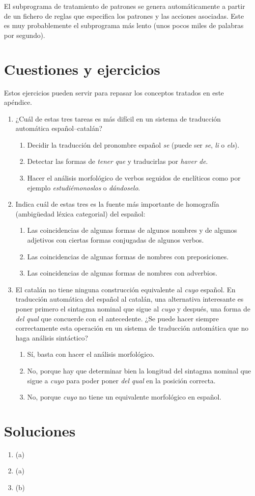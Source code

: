 El subprograma de tratamiento de patrones se genera automáticamente a partir de un fichero de reglas que especifica los patrones y las acciones asociadas. Este es muy probablemente el subprograma más lento (unos pocos miles de palabras por segundo). 

\section{Cuestiones y ejercicios} Estos ejercicios pueden servir para repasar los conceptos tratados en este apéndice. \begin{enumerate} \item¿Cuál de estas tres tareas es más difícil en un sistema de traducción automática español--catalán? \begin{enumerate} \item Decidir la traducción del pronombre español \emph{se} (puede ser \emph{se}, \emph{li} o \emph{els}). \item Detectar las formas de \emph{tener que} y traducirlas por \emph{haver de}. \item Hacer el análisis morfológico de verbos seguidos de enclíticos como por ejemplo \emph{estudiémonoslos} o \emph{dándoselo}. \end{enumerate} 

\item Indica cuál de estas tres es la fuente más importante de homografía (ambigüedad léxica categorial) del español: \begin{enumerate} \item Las coincidencias de algunas formas de algunos nombres y de algunos adjetivos con ciertas formas conjugadas de algunos verbos. \item Las coincidencias de algunas formas de nombres con preposiciones. \item Las coincidencias de algunas formas de nombres con adverbios. \end{enumerate} 

\item El catalán no tiene ninguna construcción equivalente al \emph{cuyo} español. En traducción automática del español al catalán, una alternativa interesante es poner primero el sintagma nominal que sigue al \emph{cuyo} y después, una forma de \emph{del qual} que concuerde con el antecedente. ¿Se puede hacer siempre correctamente esta operación en un sistema de traducción automática que no haga análisis sintáctico? \begin{enumerate} \item Sí, basta con hacer el análisis morfológico. \item No, porque hay que determinar bien la longitud del sintagma nominal que sigue a \emph{cuyo} para poder poner \emph{del qual} en la posición correcta. \item No, porque \emph{cuyo} no tiene un equivalente morfológico en español. \end{enumerate} 

\end{enumerate} 

\section{Soluciones} \begin{enumerate} \item (a) \item (a) \item (b) 

\end{enumerate} 